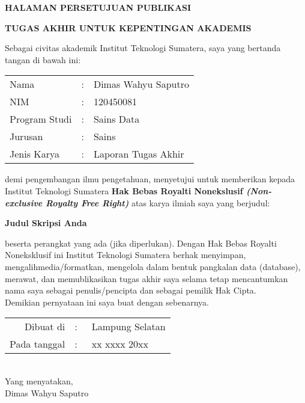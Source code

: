 \cleardoublepage
\centerline{\large\bfseries HALAMAN PERSETUJUAN PUBLIKASI}
\vspace*{1ex}
\centerline{\large\bfseries TUGAS AKHIR UNTUK KEPENTINGAN AKADEMIS}
{}
\vspace*{40pt}
Sebagai civitas akademik Institut Teknologi Sumatera, saya yang bertanda tangan di bawah ini:
\begin{spacing}{1.5}
	\begin{tabular}{lcl}
		Nama 			&:& Dimas Wahyu Saputro \\
		NIM 			&:& 120450081  \\
		Program Studi 	&:& Sains Data  \\
		Jurusan 		&:& Sains \\
		Jenis Karya 	&:& Laporan Tugas Akhir
	\end{tabular}
\end{spacing}
demi pengembangan ilmu pengetahuan, menyetujui untuk memberikan kepada Institut Teknologi Sumatera \textbf{Hak Bebas Royalti Nonekslusif \textit{(Non-exclusive Royalty Free Right)}} atas karya ilmiah saya yang berjudul:
\begin{center} \textbf{Judul Skripsi Anda}\end{center}
beserta perangkat yang ada (jika diperlukan). Dengan Hak Bebas Royalti Noneksklusif ini Institut Teknologi Sumatera berhak menyimpan, mengalihmedia/formatkan, mengelola dalam bentuk pangkalan data (database), merawat, dan memublikasikan tugas akhir saya selama tetap mencantumkan nama saya sebagai penulis/pencipta dan sebagai pemilik Hak Cipta.\\
Demikian pernyataan ini saya buat dengan sebenarnya.
\begin{center}
\begin{tabular}{rcl}
	Dibuat di 		&:&~Lampung Selatan\\
	Pada tanggal 	&:&~xx xxxx 20xx \\
\end{tabular}
\\[2ex]
Yang menyatakan,\\[10ex]
Dimas Wahyu Saputro
\end{center}
